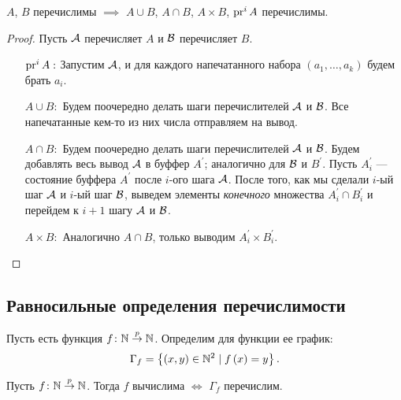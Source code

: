 \begin{statement}
    $A$, $B$ перечислимы $\implies$ $A \cup B$, $A \cap B$, $A \times B$, $\pr^{i} A$ перечислимы.
\end{statement}
\begin{proof}
    Пусть $\AA$ перечисляет $A$ и $\BB$ перечисляет $B$.
    \begin{enumerate}
        \item[$\pr^{i} A:$] Запустим $\AA$, и для каждого напечатанного набора $\left(a_{1}, \ldots, a_{k}\right)$ будем брать $a_{i}$.
        \item[$A \cup B:$] Будем поочередно делать шаги перечислителей $\AA$ и $\BB$.
        Все напечатанные кем-то из них числа отправляем на вывод.
        \item[$A \cap B:$] Будем поочередно делать шаги перечислителей $\AA$ и $\BB$.
        Будем добавлять весь вывод $\AA$ в буффер $A^{\prime}$; аналогично для $\BB$ и $B^{\prime}$.
        Пусть $A_{i}^{\prime}$ --- состояние буффера $A^{\prime}$ после $i$-ого шага $\AA$.
        После того, как мы сделали $i$-ый шаг $\AA$ и $i$-ый шаг $\BB$, выведем элементы {\it конечного} множества $A^{\prime}_{i} \cap B^{\prime}_{i}$ и перейдем к $i + 1$ шагу $\AA$ и $\BB$.
        \item[$A \times B:$] Аналогично $A \cap B$, только выводим $A^{\prime}_{i} \times B^{\prime}_{i}$.
        \qedhere
    \end{enumerate}
\end{proof}

\subsection{Равносильные определения перечислимости}

\begin{definition}
    Пусть есть функция $f \colon \N \pto \N$.
    Определим для функции ее график:
    $$
        \Gamma_{f} = \left\{\left(x, y\right) \in \N^{2} \mid f\left(x\right) = y\right\}.
    $$
\end{definition}

\begin{theorem}
    Пусть $f \colon \N \pto \N$.
    Тогда $f$ вычислима $\iff$ $\Gamma_{f}$ перечислим.
\end{theorem}

